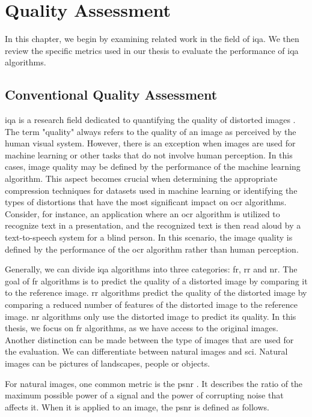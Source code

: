 \chapter{Quality Assessment}
\label{chap:qualityassessment}

In this chapter, we begin by examining related work in the field of \gls{iqa}.
We then review the specific metrics used in our thesis to evaluate the performance of \gls{iqa} algorithms.

\section{Conventional Quality Assessment}

\Gls{iqa} is a research field dedicated to quantifying the quality of distorted images \cite{iqa_survey_2020}.
The term "quality" always refers to the quality of an image as perceived by the human visual system.
However, there is an exception when images are used for machine learning or other tasks that do not involve human perception.
In this cases, image quality may be defined by the performance of the machine learning algorithm.
This aspect becomes crucial when determining the appropriate compression techniques for datasets used in machine learning or identifying the types of distortions that have the most significant impact on \gls{ocr} algorithms.
Consider, for instance, an application where an \gls{ocr} algorithm is utilized to recognize text in a presentation, and the recognized text is then read aloud by a text-to-speech system for a blind person.
In this scenario, the image quality is defined by the performance of the \gls{ocr} algorithm rather than human perception.

Generally, we can divide \gls{iqa} algorithms into three categories: \gls{fr}, \gls{rr} and \gls{nr}.
The goal of \gls{fr} algorithms is to predict the quality of a distorted image by comparing it to the reference image.
\Gls{rr} algorithms predict the quality of the distorted image by comparing a reduced number of features of the distorted image to the reference image.
\Gls{nr} algorithms only use the distorted image to predict its quality.
In this thesis, we focus on \gls{fr} algorithms, as we have access to the original images.
Another distinction can be made between the type of images that are used for the evaluation.
We can differentiate between natural images and \gls{sci}.
Natural images can be pictures of landscapes, people or objects.

For natural images, one common metric is the \gls{psnr} \cite{PSNRvsSSIM_2010}.
It describes the ratio of the maximum possible power of a signal and the power of corrupting noise that affects it.
When it is applied to an image, the \gls{psnr} is defined as follows.

